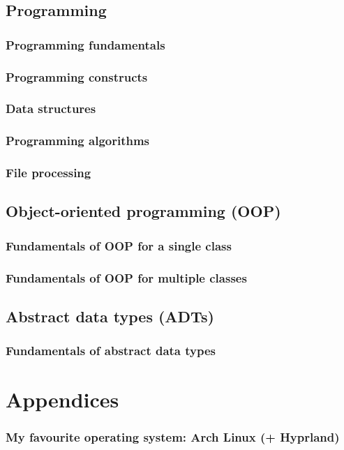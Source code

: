 \documentclass[a4paper,12pt]{article}
\begin{document}
\subsection{Programming}
\subsubsection{Programming fundamentals}
\subsubsection{Programming constructs}
\subsubsection{Data structures}
\subsubsection{Programming algorithms}
\subsubsection{File processing}
\subsection{Object-oriented programming (OOP)}
\subsubsection{Fundamentals of OOP for a single class}
\subsubsection{Fundamentals of OOP for multiple classes}
\subsection{Abstract data types (ADTs)}
\subsubsection{Fundamentals of abstract data types}
\newpage
\section{Appendices}
\subsubsection{My favourite operating system: Arch Linux (+ Hyprland)}
\end{document}
